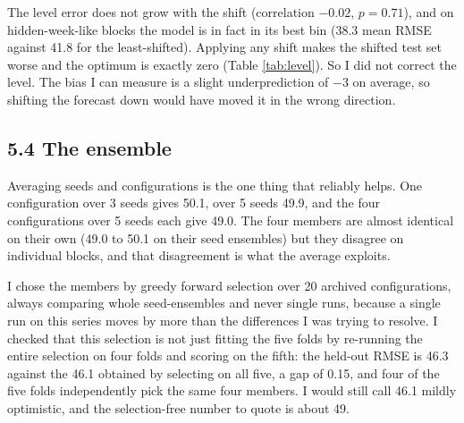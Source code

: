 \documentclass[11pt,letterpaper]{article}
\begin{document}
\begin{table}[H]
\centering
\small

\caption{Shifting the whole forecast on the most covariate-shifted held-out blocks. The best correction is none.}
\label{tab:level}
\end{table}

The level error does not grow with the shift (correlation $-0.02$, $p=0.71$), and on hidden-week-like blocks the model is in fact in its {best} bin (38.3 mean RMSE against 41.8 for the least-shifted). Applying any shift makes the shifted test set worse and the optimum is exactly zero (Table \ref{tab:level}). So I did not correct the level. The bias I can measure is a slight {under}prediction of $-3$ on average, so shifting the forecast down would have moved it in the wrong direction.

\subsection*{5.4 The ensemble}

\begin{table}[H]
\centering
\small

\caption{Ensembling. The five-fold column is the pooled RMSE over all five chronological folds. The four configurations differ only in encoder depth (2 or 3 blocks) and the width of the decomposition's moving average (25 or 97), and one of them uses the ten raw variables without the harmonics.}
\label{tab:upgrade}
\end{table}

Averaging seeds and configurations is the one thing that reliably helps. One configuration over 3 seeds gives 50.1, over 5 seeds 49.9, and the four configurations over 5 seeds each give 49.0. The four members are almost identical on their own (49.0 to 50.1 on their seed ensembles) but they disagree on individual blocks, and that disagreement is what the average exploits.

I chose the members by greedy forward selection over 20 archived configurations, always comparing whole seed-ensembles and never single runs, because a single run on this series moves by more than the differences I was trying to resolve. I checked that this selection is not just fitting the five folds by re-running the {entire} selection on four folds and scoring on the fifth: the held-out RMSE is 46.3 against the 46.1 obtained by selecting on all five, a gap of 0.15, and four of the five folds independently pick the same four members. I would still call 46.1 mildly optimistic, and the selection-free number to quote is about 49.
\end{document}
